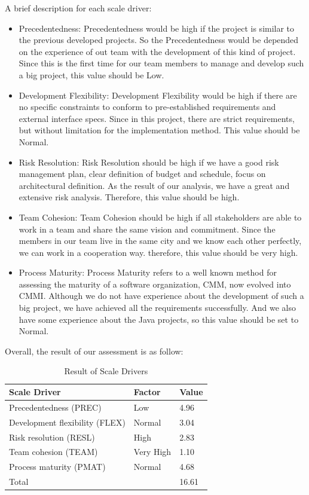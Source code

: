 \documentclass{article}
\begin{document}
\begin{table}[H]
\begin{tabular}{@{}|l|l|l|l|l|l|l|@{}}
		\hline
	\end{tabular}
\end{table}
A brief description for each scale driver:
\begin{itemize}
	\item Precedentedness: Precedentedness would be high if the project is similar to the previous developed projects. So the Precedentedness would be depended on the experience of out team with the development of this kind of project. Since this is the first time for our team members to manage and develop such a big project, this value should be Low.
	\item Development Flexibility: Development Flexibility would be high if there are no specific constraints to conform to pre-established requirements and external interface specs. Since in this project, there are strict requirements, but without limitation for the implementation method. This value should be Normal.
	\item Risk Resolution: Risk Resolution should be high if we have a good risk management plan, clear definition of budget and schedule, focus on architectural definition. As the result of our analysis, we have a great and extensive risk analysis. Therefore, this value should be high.
	\item Team Cohesion: Team Cohesion should be high if all stakeholders are able to work in a team and share the same vision and commitment. Since the members in our team live in the same city and we know each other perfectly, we can work in a cooperation way. therefore, this value should be very high.
	\item Process Maturity: Process Maturity refers to a well known method for assessing the maturity of a software organization, CMM, now evolved into CMMI. Although we do not have experience about the development of such a big project, we have achieved all the requirements successfully. And we also have some experience about the Java projects, so this value should be set to Normal.
\end{itemize}
Overall, the result of our assessment is as follow:
\begin{table}[H]
	\centering
	\caption{Result of Scale Drivers}
	\label{my-label}
	\begin{tabular}{|l|l|l|}
		\hline
		Scale Driver                       & Factor    & Value \\ \hline
		Precedentedness (PREC)   & Low       & 4.96   \\ \hline
		Development flexibility (FLEX)  & Normal       & 3.04   \\ \hline
		Risk resolution (RESL) & High       & 2.83   \\ \hline
		Team cohesion (TEAM)  & Very High      & 1.10   \\ \hline
		Process maturity (PMAT)      & Normal    & 4.68 \\ \hline
		\multicolumn{2}{|l|}{Total}                    & 16.61  \\ \hline
	\end{tabular}
\end{table}
\newpage
\end{document}
